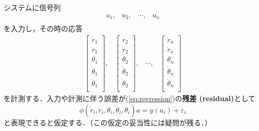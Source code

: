 システムに信号列
\[
 \begin{array}{cccc}
  u_1, & u_2, & \cdots, & u_n\\
 \end{array}
\]
を入力し，その時の応答
\[
 \begin{array}{cccc}
  \left[
   \begin{array}{c}
    \dot{r}_1 \\
    \ddot{r}_1 \\
    \theta_1 \\
    \dot{\theta}_1 \\
    \ddot{\theta}_1 \\
   \end{array}
  \right], &
  \left[
   \begin{array}{c}
    \dot{r}_2 \\
    \ddot{r}_2 \\
    \theta_2 \\
    \dot{\theta}_2 \\
    \ddot{\theta}_2 \\
   \end{array}
  \right], &
  \cdots, &
  \left[
   \begin{array}{c}
    \dot{r}_n \\
    \ddot{r}_n \\
    \theta_n \\
    \dot{\theta}_n \\
    \ddot{\theta}_n \\
   \end{array}
  \right]
 \end{array}
\]
を計測する．入力や計測に伴う誤差が(\ref{eq:regression})の{\bf 残差
(residual)}として
\begin{equation}
 \phi(\dot{r}_i, \ddot{r}_i, \theta_i, \dot{\theta}_i, \ddot{\theta}_i) a
  = y(u_i) + \varepsilon_i
\end{equation}
と表現できると仮定する．（この仮定の妥当性には疑問が残る．）


